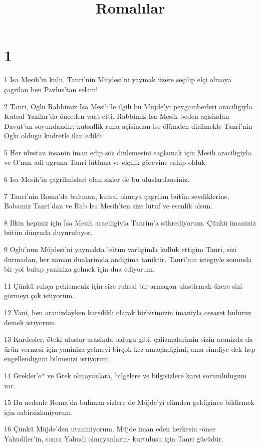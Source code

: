 

\title{Romalılar}


\chapter{1}

\par 1 Isa Mesih'in kulu, Tanri'nin Müjdesi'ni yaymak üzere seçilip elçi olmaya çagrilan ben Pavlus'tan selam!
\par 2 Tanri, Oglu Rabbimiz Isa Mesih'le ilgili bu Müjde'yi peygamberleri araciligiyla Kutsal Yazilar'da önceden vaat etti. Rabbimiz Isa Mesih beden açisindan Davut'un soyundandir; kutsallik ruhu açisindan ise ölümden dirilmekle Tanri'nin Oglu oldugu kudretle ilan edildi.
\par 5 Her ulustan insanin iman edip söz dinlemesini saglamak için Mesih araciligiyla ve O'nun adi ugruna Tanri lütfuna ve elçilik görevine sahip olduk.
\par 6 Isa Mesih'in çagrilmislari olan sizler de bu uluslardansiniz.
\par 7 Tanri'nin Roma'da bulunan, kutsal olmaya çagrilan bütün sevdiklerine, Babamiz Tanri'dan ve Rab Isa Mesih'ten size lütuf ve esenlik olsun.
\par 8 Ilkin hepiniz için Isa Mesih araciligiyla Tanrim'a sükrediyorum. Çünkü imaniniz bütün dünyada duyuruluyor.
\par 9 Oglu'nun Müjdesi'ni yaymakta bütün varligimla kulluk ettigim Tanri, sizi durmadan, her zaman dualarimda andigima taniktir. Tanri'nin istegiyle sonunda bir yol bulup yaniniza gelmek için dua ediyorum.
\par 11 Çünkü ruhça pekismeniz için size ruhsal bir armagan ulastirmak üzere sizi görmeyi çok istiyorum.
\par 12 Yani, ben aranizdayken karsilikli olarak birbirimizin imaniyla cesaret buluruz demek istiyorum.
\par 13 Kardesler, öteki uluslar arasinda oldugu gibi, çalismalarimin sizin aranizda da ürün vermesi için yaniniza gelmeyi birçok kez amaçladigimi, ama simdiye dek hep engellendigimi bilmenizi istiyorum.
\par 14 Grekler'e* ve Grek olmayanlara, bilgelere ve bilgisizlere karsi sorumlulugum var.
\par 15 Bu nedenle Roma'da bulunan sizlere de Müjde'yi elimden geldigince bildirmek için sabirsizlaniyorum.
\par 16 Çünkü Müjde'den utanmiyorum. Müjde iman eden herkesin -önce Yahudiler'in, sonra Yahudi olmayanlarin- kurtulusu için Tanri gücüdür.

